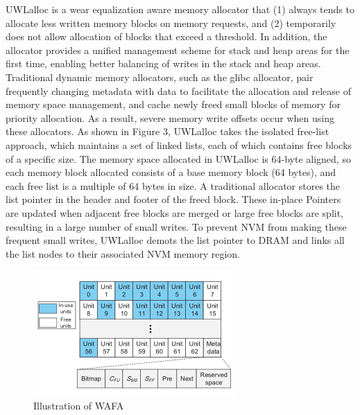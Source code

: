 \documentclass[sigconf]{acmart}
\begin{document}
UWLalloc is a wear equalization aware memory allocator that (1) always tends to allocate less written memory blocks on memory requests, and (2) temporarily does not allow allocation of blocks that exceed a threshold. In addition, the allocator provides a unified management scheme for stack and heap areas for the first time, enabling better balancing of writes in the stack and heap areas. Traditional dynamic memory allocators, such as the glibc allocator, pair frequently changing metadata with data to facilitate the allocation and release of memory space management, and cache newly freed small blocks of memory for priority allocation. As a result, severe memory write offsets occur when using these allocators. As shown in Figure 3, UWLalloc takes the isolated free-list approach, which maintains a set of linked lists, each of which contains free blocks of a specific size. The memory space allocated in UWLalloc is 64-byte aligned, so each memory block allocated consists of a base memory block (64 bytes), and each free list is a multiple of 64 bytes in size. A traditional allocator stores the list pointer in the header and footer of the freed block. These in-place Pointers are updated when adjacent free blocks are merged or large free blocks are split, resulting in a large number of small writes. To prevent NVM from making these frequent small writes, UWLalloc demots the list pointer to DRAM and links all the list nodes to their associated NVM memory region.

\begin{figure}
	\centering
	\includegraphics[width=0.7\linewidth]{"figure 4"}
	\caption{Illustration of WAFA}
	\label{fig:figure-4}
\end{figure}
\end{document}
